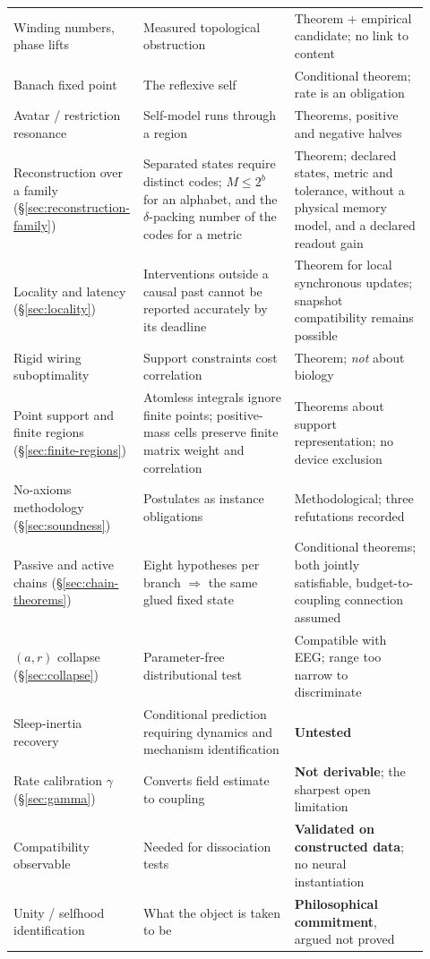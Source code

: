 \documentclass[11pt]{article}
\begin{document}
\begin{longtable}{@{}p{0.24\linewidth}p{0.36\linewidth}p{0.32\linewidth}@{}}
Winding numbers, phase lifts & Measured topological obstruction & Theorem + empirical candidate; no link to content \\
Banach fixed point & The reflexive self & Conditional theorem; rate is an obligation \\
Avatar / restriction resonance & Self-model runs through a region & Theorems, positive and negative halves \\
\raggedright Reconstruction over a family (\S\ref{sec:reconstruction-family}) & \raggedright Separated states require distinct codes; $M\leq2^b$ for an alphabet, and the $\delta$-packing number of the codes for a metric & \raggedright\arraybackslash Theorem; declared states, metric and tolerance, without a physical memory model, and a declared readout gain \\
\raggedright Locality and latency (\S\ref{sec:locality}) & \raggedright Interventions outside a causal past cannot be reported accurately by its deadline & \raggedright\arraybackslash Theorem for local synchronous updates; snapshot compatibility remains possible \\
Rigid wiring suboptimality & Support constraints cost correlation & Theorem; \emph{not} about biology \\
Point support and finite regions (\S\ref{sec:finite-regions}) & \raggedright Atomless integrals ignore finite points; positive-mass cells preserve finite matrix weight and correlation & \raggedright\arraybackslash Theorems about support representation; no device exclusion \\
No-axioms methodology (\S\ref{sec:soundness}) & Postulates as instance obligations & Methodological; three refutations recorded \\
Passive and active chains (\S\ref{sec:chain-theorems}) & Eight hypotheses per branch $\Rightarrow$ the same glued fixed state & Conditional theorems; both jointly satisfiable, budget-to-coupling connection assumed \\
$(a,r)$ collapse (\S\ref{sec:collapse}) & Parameter-free distributional test & Compatible with EEG; range too narrow to discriminate \\
Sleep-inertia recovery & Conditional prediction requiring dynamics and mechanism identification & \textbf{Untested} \\
Rate calibration $\gamma$ (\S\ref{sec:gamma}) & Converts field estimate to coupling & \textbf{Not derivable}; the sharpest open limitation \\
Compatibility observable & Needed for dissociation tests & \textbf{Validated on constructed data}; no neural instantiation \\
Unity / selfhood identification & What the object is taken to be & \textbf{Philosophical commitment}, argued not proved \\
\hline
\end{longtable}
\endgroup
\end{document}
